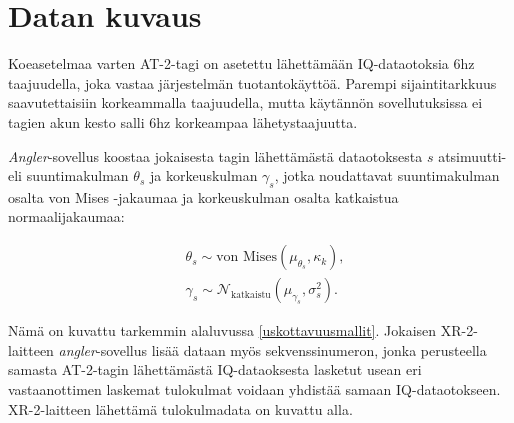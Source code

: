\documentclass[
  12pt,
  a4paper, twoside]{book}
\begin{document}
\section{Datan kuvaus} \label{datan-kuvaus}

Koeasetelmaa varten AT-2-tagi on asetettu lähettämään IQ-dataotoksia 6hz taajuudella, joka vastaa järjestelmän tuotantokäyttöä. Parempi sijaintitarkkuus saavutettaisiin korkeammalla taajuudella, mutta käytännön sovellutuksissa ei tagien akun kesto salli 6hz korkeampaa lähetystaajuutta.

\emph{Angler}-sovellus koostaa jokaisesta tagin lähettämästä dataotoksesta \(s\) atsimuutti- eli suuntimakulman \(\theta_s\) ja korkeuskulman \(\gamma_s\), jotka noudattavat suuntimakulman osalta von Mises -jakaumaa ja korkeuskulman osalta katkaistua normaalijakaumaa:

\begin{align}
&\theta_{s} \sim \text{von Mises}(\mu_{\theta_s}, \kappa_k),\\
&\gamma_{s} \sim \mathcal{N}_{\text{katkaistu}} (\mu_{\gamma_s}, \sigma^2_s).
\end{align}

Nämä on kuvattu tarkemmin alaluvussa \ref{uskottavuusmallit}. Jokaisen XR-2-laitteen \emph{angler}-sovellus lisää dataan myös sekvenssinumeron, jonka perusteella samasta AT-2-tagin lähettämästä IQ-dataoksesta lasketut usean eri vastaanottimen laskemat tulokulmat voidaan yhdistää samaan IQ-dataotokseen. XR-2-laitteen lähettämä tulokulmadata on kuvattu alla.
\end{document}
